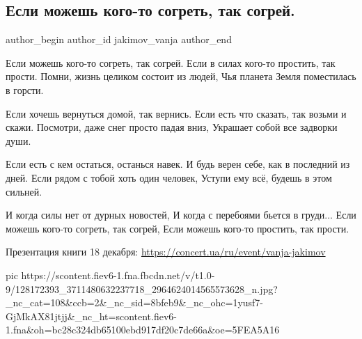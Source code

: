  
 
 
 
 
 
\subsection{Если можешь кого-то согреть, так согрей.}
\label{sec:28_11_2020.fb.jakimov_vanja.1.esli_mozhesh_sogrej}
\ifcmt
	author_begin
   author_id jakimov_vanja
	author_end
\fi

\begin{multicols}{2}
	\obeycr
Если можешь кого-то согреть, так согрей.
Если в силах кого-то простить, так прости.
Помни, жизнь целиком состоит из людей,
Чья планета Земля поместилась в горсти.

Если хочешь вернуться домой, так вернись.
Если есть что сказать, так возьми и скажи.
Посмотри, даже снег просто падая вниз,
Украшает собой все задворки души.

Если есть с кем остаться, останься навек.
И будь верен себе, как в последний из дней.
Если рядом с тобой хоть один человек,
Уступи ему всё, будешь в этом сильней.

И когда силы нет от дурных новостей,
И когда с перебоями бьется в груди...
Если можешь кого-то согреть, так согрей,
Если можешь кого-то простить, так прости.

	\restorecr
\end{multicols}
Презентация книги 18 декабря: \url{https://concert.ua/ru/event/vanja-jakimov}

\ifcmt
pic https://scontent.fiev6-1.fna.fbcdn.net/v/t1.0-9/128172393_3711480632237718_2964624014565573628_n.jpg?_nc_cat=108&ccb=2&_nc_sid=8bfeb9&_nc_ohc=1yusf7-GjMkAX81jtjj&_nc_ht=scontent.fiev6-1.fna&oh=bc28c324db65100ebd917df20c7de66a&oe=5FEA5A16
\fi
